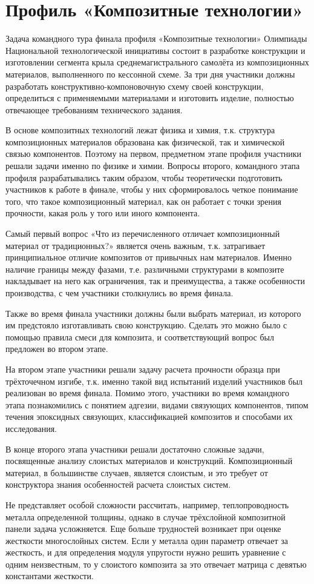 %

\chapter{Профиль «Композитные технологии»}

Задача командного тура финала профиля «Композитные технологии»
Олимпиады Национальной технологической инициативы состоит в
разработке конструкции и изготовлении сегмента крыла
среднемагистрального самолёта из композиционных материалов,
выполненного по кессонной схеме. За три дня участники должны разработать
конструктивно-компоновочную схему своей конструкции, определиться с
применяемыми материалами и изготовить изделие, полностью отвечающее
требованиям технического задания.

В основе композитных технологий лежат физика и химия, т.к.
структура композиционных материалов образована как физической, так и
химической связью компонентов. Поэтому на первом, предметном этапе
профиля участники решали задачи именно по физике и химии.
Вопросы второго, командного этапа профиля разрабатывались таким
образом, чтобы теоретически подготовить участников к работе в финале,
чтобы у них сформировалось четкое понимание того, что такое
композиционный материал, как он работает с точки зрения прочности, какая
роль у того или иного компонента.

Самый первый вопрос «Что из перечисленного отличает
композиционный материал от традиционных?» является очень важным, т.к.
затрагивает принципиальное отличие композитов от привычных нам
материалов. Именно наличие границы между фазами, т.е. различными
структурами в композите накладывает на него как ограничения, так и
преимущества, а также особенности производства, с чем участники
столкнулись во время финала.

Также во время финала участники должны были выбрать материал, из
которого им предстояло изготавливать свою конструкцию. Сделать это
можно было с помощью правила смеси для композита, и соответствующий
вопрос был предложен во втором этапе.

На втором этапе участники решали задачу расчета прочности образца
при трёхточечном изгибе, т.к. именно такой вид испытаний изделий
участников был реализован во время финала.
Помимо этого, участники во время командного этапа познакомились с
понятием адгезии, видами связующих компонентов, типом течения
эпоксидных связующих, классификацией композитов и способами их
исследования.

В конце второго этапа участники решали достаточно сложные задачи,
посвященные анализу слоистых материалов и конструкций.
Композиционный материал, в большинстве случаев, является слоистым, и
это требует от конструктора знания особенностей расчета слоистых систем.

Не представляет особой сложности рассчитать, например, теплопроводность
металла определенной толщины, однако в случае трёхслойной композитной
панели задача усложняется. Еще больше трудностей возникает при оценке
жесткости многослойных систем. Если у металла один параметр отвечает за
жесткость, и для определения модуля упругости нужно решить уравнение с
одним неизвестным, то у слоистого композита за это отвечает матрица с
девятью константами жесткости.